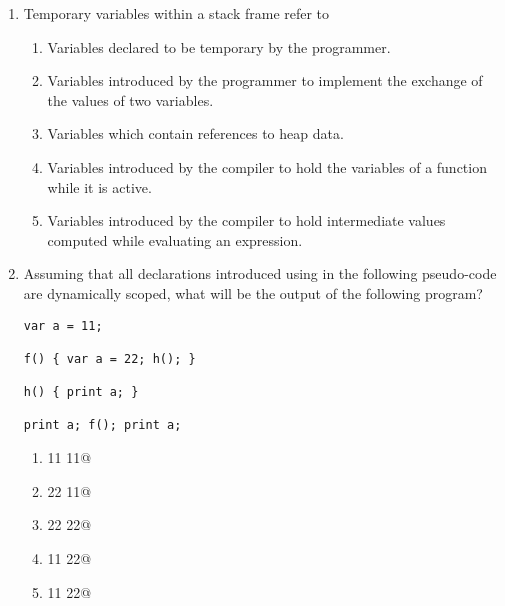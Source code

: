 \documentclass[12pt]{article}
\begin{document}
\begin{enumerate}
\begin{enumerate}
\end{enumerate}


\item Temporary variables within a stack frame refer to

\begin{enumerate}

  \item Variables declared to be temporary by the programmer.

  \item Variables introduced by the programmer to implement the
    exchange of the values of two variables.

  \item Variables which contain references to heap data.

  \item Variables introduced by the compiler to hold
    the variables of a function while it is active.

  \item Variables introduced by the compiler to hold intermediate
    values computed while evaluating an expression.
         
    
\end{enumerate}

\newpage

\item Assuming that all declarations introduced using \verb@var@ in
  the following pseudo-code are dynamically scoped, what will be
  the output of the following program?

\begin{verbatim}
var a = 11;

f() { var a = 22; h(); }

h() { print a; }

print a; f(); print a;
\end{verbatim}

\begin{enumerate}

\item {} 11 11@

\item {} 22 11@

\item {} 22 22@

\item {} 11 22@

\item {} 11 22@
    
\end{enumerate}


\end{enumerate}
\end{document}
